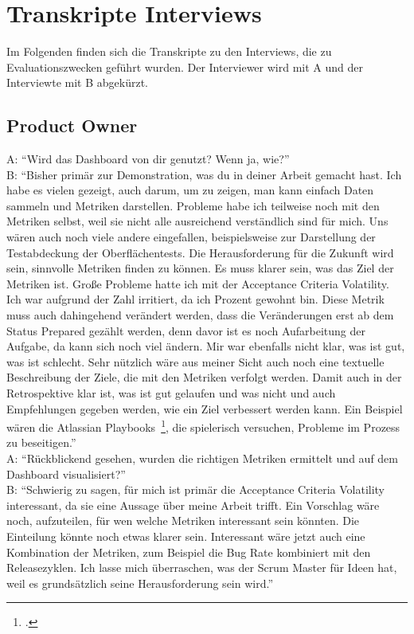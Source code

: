 \newpage
\section{Transkripte Interviews}\label{appendix:transcript}

Im Folgenden finden sich die Transkripte zu den Interviews, die zu Evaluationszwecken geführt wurden.
Der Interviewer wird mit A und der Interviewte mit B abgekürzt.

\subsection{Product Owner}

A\@: ``Wird das Dashboard von dir genutzt? Wenn ja, wie?'' \\
B\@: ``Bisher primär zur Demonstration, was du in deiner Arbeit gemacht hast. Ich habe es vielen gezeigt, auch darum, um zu zeigen, man kann einfach Daten sammeln und Metriken darstellen. Probleme habe ich teilweise noch mit den Metriken selbst, weil sie nicht alle ausreichend verständlich sind für mich. Uns wären auch noch viele andere eingefallen, beispielsweise zur Darstellung der Testabdeckung der Oberflächentests. Die Herausforderung für die Zukunft wird sein, sinnvolle Metriken finden zu können. Es muss klarer sein, was das Ziel der Metriken ist. Große Probleme hatte ich mit der Acceptance Criteria Volatility. Ich war aufgrund der Zahl irritiert, da ich Prozent gewohnt bin. Diese Metrik muss auch dahingehend verändert werden, dass die Veränderungen erst ab dem Status Prepared gezählt werden, denn davor ist es noch Aufarbeitung der Aufgabe, da kann sich noch viel ändern. Mir war ebenfalls nicht klar, was ist gut, was ist schlecht. Sehr nützlich wäre aus meiner Sicht auch noch eine textuelle Beschreibung der Ziele, die mit den Metriken verfolgt werden. Damit auch in der Retrospektive klar ist, was ist gut gelaufen und was nicht und auch Empfehlungen gegeben werden, wie ein Ziel verbessert werden kann. Ein Beispiel wären die Atlassian Playbooks~\footcite{atlassian_playbook}, die spielerisch versuchen, Probleme im Prozess zu beseitigen.'' \\
A\@: ``Rückblickend gesehen, wurden die richtigen Metriken ermittelt und auf dem Dashboard visualisiert?'' \\
B\@: ``Schwierig zu sagen, für mich ist primär die Acceptance Criteria Volatility interessant, da sie eine Aussage über meine Arbeit trifft. Ein Vorschlag wäre noch, aufzuteilen, für wen welche Metriken interessant sein könnten. Die Einteilung könnte noch etwas klarer sein. Interessant wäre jetzt auch eine Kombination der Metriken, zum Beispiel die Bug Rate kombiniert mit den Releasezyklen. Ich lasse mich überraschen, was der Scrum Master für Ideen hat, weil es grundsätzlich seine Herausforderung sein wird.''

